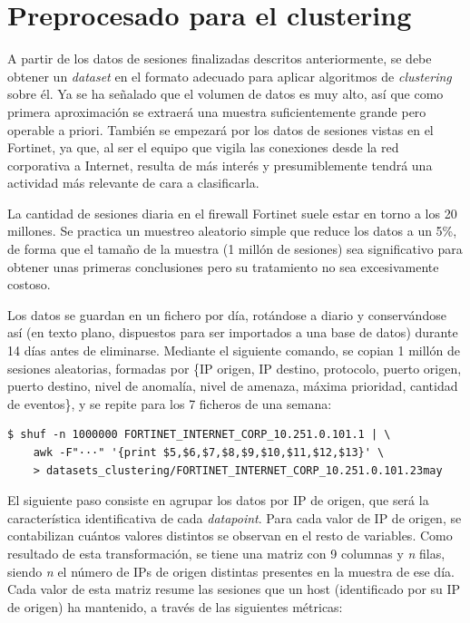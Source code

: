\section{Preprocesado para el clustering}\label{sec:preprocesado}

A partir de los datos de sesiones finalizadas descritos anteriormente, se debe obtener un \emph{dataset} en el formato adecuado para aplicar algoritmos de \emph{clustering} sobre él.
Ya se ha señalado que el volumen de datos es muy alto, así que como primera aproximación se extraerá una muestra suficientemente grande pero operable a priori.
También se empezará por los datos de sesiones vistas en el Fortinet, ya que, al ser el equipo que vigila las conexiones desde la red corporativa a Internet,
resulta de más interés y presumiblemente tendrá una actividad más relevante de cara a clasificarla.

La cantidad de sesiones diaria en el firewall Fortinet suele estar en torno a los 20 millones.
Se practica un muestreo aleatorio simple que reduce los datos a un 5\%,
de forma que el tamaño de la muestra (1 millón de sesiones) sea significativo para obtener unas primeras conclusiones pero su tratamiento no sea excesivamente costoso.

Los datos se guardan en un fichero por día, rotándose a diario y conservándose así (en texto plano, dispuestos para ser importados a una base de datos) durante 14 días antes de eliminarse.
Mediante el siguiente comando, se copian 1 millón de sesiones aleatorias, formadas por
\{IP origen, IP destino, protocolo, puerto origen, puerto destino, nivel de anomalía, nivel de amenaza, máxima prioridad, cantidad de eventos\},
y se repite para los 7 ficheros de una semana:

\begin{verbatim}
$ shuf -n 1000000 FORTINET_INTERNET_CORP_10.251.0.101.1 | \
    awk -F"···" '{print $5,$6,$7,$8,$9,$10,$11,$12,$13}' \
    > datasets_clustering/FORTINET_INTERNET_CORP_10.251.0.101.23may
\end{verbatim}

El siguiente paso consiste en agrupar los datos por IP de origen, que será la característica identificativa de cada \emph{datapoint}.
Para cada valor de IP de origen, se contabilizan cuántos valores distintos se observan en el resto de variables.
Como resultado de esta transformación, se tiene una matriz con 9 columnas y \emph{n} filas, siendo \emph{n} el número de IPs de origen distintas presentes en la muestra de ese día.
Cada valor de esta matriz resume las sesiones que un host (identificado por su IP de origen) ha mantenido, a través de las siguientes métricas:


